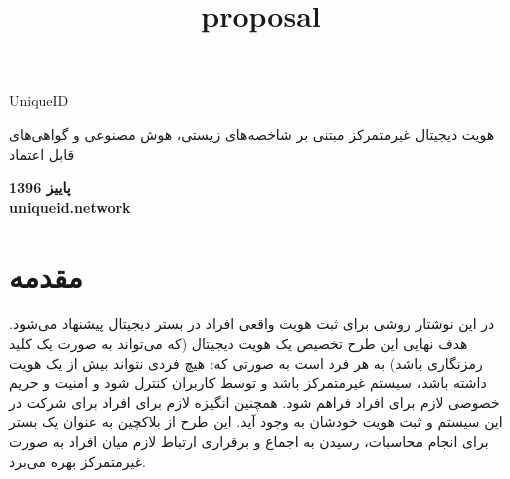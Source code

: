 \documentclass{article}
\title{proposal}
\begin{document}
\begin{titlepage}
\begin{center}
\begin{Huge}
UniqueID
\end{Huge}

\vspace{45mm}

\begin{huge}
هویت دیجیتال غیرمتمرکز مبتنی بر شاخصه‌های زیستی، هوش مصنوعی و گواهی‌های قابل اعتماد
\end{huge}


\vspace{85mm}

\textbf{ پاییز 1396}
\\
\textbf{ uniqueid.network}
\end{center}
\end{titlepage}

\section{ مقدمه}
در این نوشتار روشی برای ثبت هویت واقعی افراد در بستر دیجیتال پیشنهاد می‌شود. هدف نهایی این طرح تخصیص یک هویت دیجیتال (که می‌تواند به صورت یک کلید رمزنگاری باشد) به هر فرد است به صورتی که: هیچ فردی نتواند بیش از یک هویت داشته باشد، سیستم غیرمتمرکز باشد و توسط کاربران کنترل شود و امنیت و حریم خصوصی لازم برای افراد فراهم شود. همچنین انگیزه لازم برای افراد برای شرکت در این سیستم و ثبت هویت خودشان به وجود آید. این طرح از بلاکچین به عنوان یک بستر برای انجام محاسبات، رسیدن به اجماع و برقراری ارتباط لازم میان افراد به صورت غیرمتمرکز بهره می‌برد.
\end{document}
